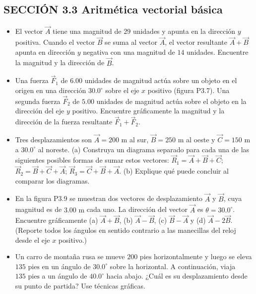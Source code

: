 \documentclass[11pt,a4paper]{article}
\begin{document}
\newpage

\subsection*{SECCIÓN 3.3 Aritmética vectorial básica}

\begin{itemize}
    \item[\textbf{6.}] El vector $\vec{A}$ tiene una magnitud de $29$ unidades y apunta en la dirección $y$ positiva. Cuando el vector $\vec{B}$ se suma al vector $\vec{A}$, el vector resultante $\vec{A} + \vec{B}$ apunta en dirección $y$ negativa con una magnitud de $14$ unidades. Encuentre la magnitud y la dirección de $\vec{B}$.
    \vspace*{6cm}

    \item[\textbf{7.}] Una fuerza $\vec{F}_1$ de $6.00$ unidades de magnitud actúa sobre un objeto en el origen en una dirección $30.0^\circ$ sobre el eje $x$ positivo (figura P3.7). Una segunda fuerza $\vec{F}_2$ de $5.00$ unidades de magnitud actúa sobre el objeto en la dirección del eje $y$ positivo. Encuentre gráficamente la magnitud y la dirección de la fuerza resultante $\vec{F}_1 + \vec{F}_2$.
    \vspace*{6cm}

    \item[\textbf{8.}] Tres desplazamientos son $\vec{A} = 200 \text{ m}$ al sur, $\vec{B} = 250 \text{ m}$ al oeste y $\vec{C} = 150 \text{ m}$ a $30.0^\circ$ al noreste. (a) Construya un diagrama separado para cada una de las siguientes posibles formas de sumar estos vectores: $\vec{R}_1 = \vec{A} + \vec{B} + \vec{C}$; $\vec{R}_2 = \vec{B} + \vec{C} + \vec{A}$; $\vec{R}_3 = \vec{C} + \vec{B} + \vec{A}$. (b) Explique qué puede concluir al comparar los diagramas.
    \vspace*{8cm}

    \item[\textbf{9.}] En la figura P3.9 se muestran dos vectores de desplazamiento $\vec{A}$ y $\vec{B}$, cuya magnitud es de $3.00 \text{ m}$ cada uno. La dirección del vector $\vec{A}$ es $\theta = 30.0^\circ$. Encuentre gráficamente (a) $\vec{A} + \vec{B}$, (b) $\vec{A} - \vec{B}$, (c) $\vec{B} - \vec{A}$ y (d) $\vec{A} - 2\vec{B}$. (Reporte todos los ángulos en sentido contrario a las manecillas del reloj desde el eje $x$ positivo.)
    \vspace*{8cm}

    \item[\textbf{10.}] Un carro de montaña rusa se mueve $200 \text{ pies}$ horizontalmente y luego se eleva $135 \text{ pies}$ en un ángulo de $30.0^\circ$ sobre la horizontal. A continuación, viaja $135 \text{ pies}$ a un ángulo de $40.0^\circ$ hacia abajo. ¿Cuál es su desplazamiento desde su punto de partida? Use técnicas gráficas.
    \vspace*{8cm}
\end{itemize}
\end{document}
